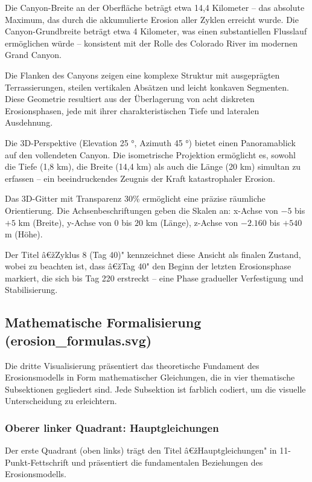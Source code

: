 Die Canyon-Breite an der Oberfläche beträgt etwa 14,4 Kilometer -- das absolute Maximum, das durch die akkumulierte Erosion aller Zyklen erreicht wurde. Die Canyon-Grundbreite beträgt etwa 4 Kilometer, was einen substantiellen Flusslauf ermöglichen würde -- konsistent mit der Rolle des Colorado River im modernen Grand Canyon.

Die Flanken des Canyons zeigen eine komplexe Struktur mit ausgeprägten Terrassierungen, steilen vertikalen Absätzen und leicht konkaven Segmenten. Diese Geometrie resultiert aus der Überlagerung von acht diskreten Erosionsphasen, jede mit ihrer charakteristischen Tiefe und lateralen Ausdehnung.

Die 3D-Perspektive (Elevation 25 °, Azimuth 45 °) bietet einen Panoramablick auf den vollendeten Canyon. Die isometrische Projektion ermöglicht es, sowohl die Tiefe (1,8 km), die Breite (14,4 km) als auch die Länge (20 km) simultan zu erfassen -- ein beeindruckendes Zeugnis der Kraft katastrophaler Erosion.

Das 3D-Gitter mit Transparenz 30\% ermöglicht eine präzise räumliche Orientierung. Die Achsenbeschriftungen geben die Skalen an: x-Achse von $-5$ bis $+5$ km (Breite), y-Achse von $0$ bis $20$ km (Länge), z-Achse von $-2.160$ bis $+540$ m (Höhe).

Der Titel â€žZyklus 8 (Tag 40)" kennzeichnet diese Ansicht als finalen Zustand, wobei zu beachten ist, dass â€žTag 40" den Beginn der letzten Erosionsphase markiert, die sich bis Tag 220 erstreckt -- eine Phase gradueller Verfestigung und Stabilisierung.

\subsection{Mathematische Formalisierung (erosion\_formulas.svg)}

Die dritte Visualisierung präsentiert das theoretische Fundament des Erosionsmodells in Form mathematischer Gleichungen, die in vier thematische Subsektionen gegliedert sind. Jede Subsektion ist farblich codiert, um die visuelle Unterscheidung zu erleichtern.

\subsubsection*{Oberer linker Quadrant: Hauptgleichungen}

Der erste Quadrant (oben links) trägt den Titel â€žHauptgleichungen" in 11-Punkt-Fettschrift und präsentiert die fundamentalen Beziehungen des Erosionsmodells.

